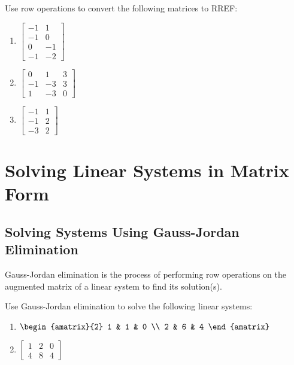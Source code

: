 \documentclass[11pt]{exam}
\begin{document}
\begin{questions}
            \item Use row operations to convert the following matrices to RREF:
            \begin{enumerate}
                \item $\begin{bmatrix}
                    -1 & 1 \\
                    -1 & 0 \\
                    0 & -1 \\
                    -1 & -2
                \end{bmatrix}$
                \item $\begin{bmatrix}
                    0 & 1 & 3 \\
                    -1 & -3 & 3 \\
                    1 & -3 & 0
                \end{bmatrix}$
                \item $\begin{bmatrix}
                    -1 & 1 \\
                    -1 & 2 \\
                    -3 & 2
                \end{bmatrix}$
            \end{enumerate}
        \end{questions}

\pagebreak
\section{Solving Linear Systems in Matrix Form}

    \vspace{20px}
    \subsection{Solving Systems Using Gauss-Jordan Elimination}
    Gauss-Jordan elimination is the process of performing row operations on the augmented matrix of a linear system to find its solution(s).
    \begin{questions}
        \item Use Gauss-Jordan elimination to solve the following linear systems:
        \begin{enumerate}
            \item $\begin{amatrix}{2}
            1 & 1 & 0 \\
            2 & 6 & 4
            \end{amatrix}$
            \item $\begin{bmatrix}
                1 & 2 & 0 \\
                4 & 8 & 4
            \end{bmatrix}$
        \end{enumerate}
    \end{questions}
\end{document}
